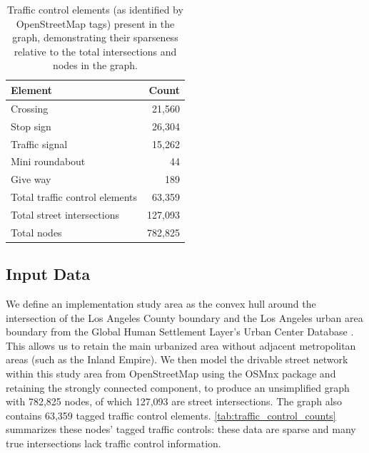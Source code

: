 \documentclass[12pt,letterpaper]{article} %
\begin{document}
\begin{table}[tb!]
    \centering
    \caption{Traffic control elements (as identified by OpenStreetMap tags) present in the graph, demonstrating their sparseness relative to the total intersections and nodes in the graph.}\label{tab:traffic_control_counts}
    \begin{tabular}{lr}
        \toprule
        Element                        &   Count \\
        \midrule
        Crossing                       &  21,560 \\
        Stop sign                      &  26,304 \\
        Traffic signal                 &  15,262 \\
        Mini roundabout                &      44 \\
        Give way                       &     189 \\
        \midrule
        Total traffic control elements &  63,359 \\
        Total street intersections     & 127,093 \\
        Total nodes                    & 782,825 \\
        \bottomrule
    \end{tabular}
\end{table}

\subsection{Input Data}

We define an implementation study area as the convex hull around the intersection of the Los Angeles County boundary and the Los Angeles urban area boundary from the Global Human Settlement Layer's Urban Center Database \citep{florczyk2019description, GHS2019}. This allows us to retain the main urbanized area without adjacent metropolitan areas (such as the Inland Empire). We then model the drivable street network within this study area from OpenStreetMap using the OSMnx package \citep{boeing_modeling_2025} and retaining the strongly connected component, to produce an unsimplified graph with 782,825 nodes, of which 127,093 are street intersections. The graph also contains 63,359 tagged traffic control elements. \autoref{tab:traffic_control_counts} summarizes these nodes' tagged traffic controls: these data are sparse and many true intersections lack traffic control information.
\end{document}
